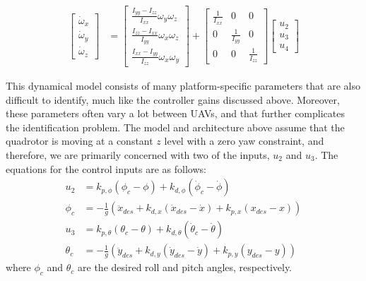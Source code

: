 \documentclass[letterpaper, 10 pt, conference]{ieeeconf}  %
\begin{document}
\begin{equation}
\begin{aligned}
	\begin{bmatrix}\dot{\omega}_{x} \\ \dot{\omega}_{y} \\ \dot{\omega}_{z}\end{bmatrix} &= \begin{bmatrix}\frac{I_{yy} - I_{zz}}{I_{xx}} \omega_{y}\omega_{z}\\ \frac{I_{zz} - I_{xx}}{I_{yy}} \omega_{x}\omega_{z} \\ \frac{I_{xx} - I_{yy}}{I_{zz}} \omega_{x}\omega_{y} \end{bmatrix} +  \begin{bmatrix}\frac{1}{I_{xx}} & 0 & 0\\ 0 & \frac{1}{I_{yy}} & 0\\ 0 & 0 & \frac{1}{I_{zz}}\end{bmatrix} \begin{bmatrix}u_{2} \\ u_{3} \\ u_{4} \end{bmatrix}
	\end{aligned}
	\label{eq:quadrotor_dynamics} \nonumber
\end{equation} \cite{esencite}

This dynamical model consists of many platform-specific parameters that are also difficult to identify, much like the controller gains discussed above. Moreover, these parameters often vary a lot between UAVs, and that further complicates the identification problem. The model and architecture above assume that the quadrotor is moving at a constant $z$ level with a zero yaw constraint, and therefore, we are primarily concerned with two of the inputs, $u_2$ and $u_3$. The equations for the control inputs are as follows:
\begin{align} \label{eq:cinputs}
    u_2 &= k_{p,\phi}(\phi_c-\phi) + k_{d,\phi}(\dot{\phi}_c - \dot{\phi}) \nonumber \\
    \phi_c &= -\frac{1}{g}(\ddot{x}_{des} + k_{d,x}(\dot{x}_{des}-\dot{x}) + k_{p,x}(x_{des}-x)) \nonumber \\
    u_3 &= k_{p,\theta}(\theta_c-\theta) + k_{d,\theta}(\dot{\theta}_c - \dot{\theta}) \nonumber \\
    \theta_c &= -\frac{1}{g}(\ddot{y}_{des} + k_{d,y}(\dot{y}_{des}-\dot{y}) + k_{p,y}(y_{des}-y))
\end{align}
where $\phi_c$ and $\theta_c$ are the desired roll and pitch angles, respectively.
\end{document}
